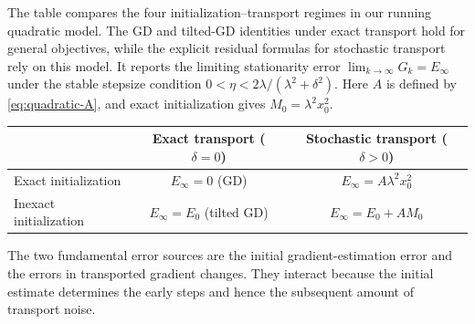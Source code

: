 The table compares the four initialization--transport regimes in our
running quadratic model. The GD and tilted-GD identities under exact
transport hold for general objectives, while the explicit residual
formulas for stochastic transport rely on this model. It reports
the limiting stationarity error $\lim_{k\to\infty}G_k=E_\infty$
under the stable stepsize condition
$0<\eta<2\lambda/(\lambda^2+\delta^2)$. Here $A$ is defined by
\eqref{eq:quadratic-A}, and exact initialization gives
$M_0=\lambda^2x_0^2$.
\begin{center}
\small
\begin{tabular}{@{}lcc@{}}
\toprule
 & Exact transport ($\delta=0$)
 & Stochastic transport ($\delta>0$)\\
\midrule
Exact initialization
 & $E_\infty=0$ (GD)
 & $E_\infty=A\lambda^2x_0^2$\\
Inexact initialization
 & $E_\infty=E_0$ (tilted GD)
 & $E_\infty=E_0+A M_0$\\
\bottomrule
\end{tabular}
\end{center}
The two fundamental error sources are the initial gradient-estimation
error and the errors in transported gradient changes. They interact
because the initial estimate determines the early steps and hence
the subsequent amount of transport noise.

